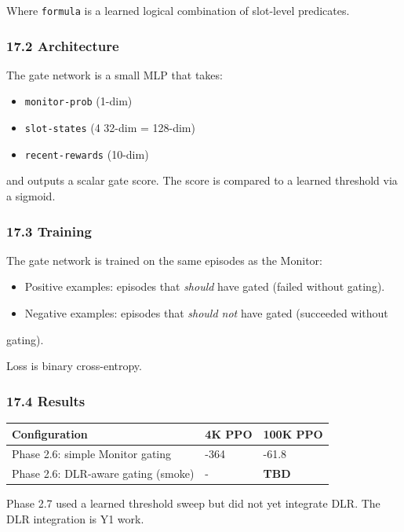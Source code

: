 \documentclass[11pt]{article}
\begin{document}
Where \texttt{formula} is a learned logical combination of slot-level predicates.

\subsubsection{17.2 Architecture}

The gate network is a small MLP that takes:

\begin{itemize}
  \item \texttt{monitor-prob} (1-dim)
  \item \texttt{slot-states} (4  32-dim = 128-dim)
  \item \texttt{recent-rewards} (10-dim)
\end{itemize}


and outputs a scalar gate score. The score is compared to a learned threshold
via a sigmoid.

\subsubsection{17.3 Training}

The gate network is trained on the same episodes as the Monitor:

\begin{itemize}
  \item Positive examples: episodes that \textit{should} have gated (failed without gating).
  \item Negative examples: episodes that \textit{should not} have gated (succeeded without
\end{itemize}

  gating).

Loss is binary cross-entropy.

\subsubsection{17.4 Results}

\begin{tabular}{lll}
Configuration & 4K PPO & 100K PPO \\
\hline
Phase 2.6: simple Monitor gating & -364 & -61.8 \\
Phase 2.6: DLR-aware gating (smoke) & - & \textbf{TBD} \\
\end{tabular}


Phase 2.7 used a learned threshold sweep but did not yet integrate DLR. The
DLR integration is Y1 work.
\end{document}
